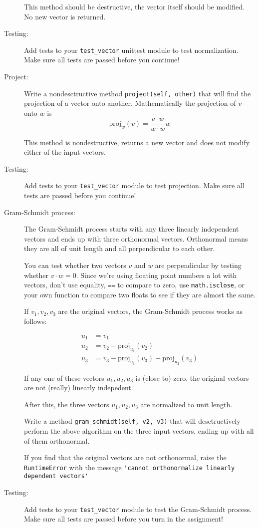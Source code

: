 \documentclass[12pt]{article}
\begin{document}
\begin{description}
This method should be destructive, the vector
itself should be modified.  No new vector is returned.


\item[Testing:] 
Add tests to your \lstinline{test_vector} unittest
module to test normalization.  Make sure all
tests are passed before
you continue!

\item[Project:] Write a nondesctructive method
\lstinline{project(self, other)}
that will find the projection of a vector onto another.
Mathematically the projection of $v$  onto $w$
is
\[ \mbox{proj}_w(v) = \frac{v \cdot w}{w \cdot w} w \]

This method is nondestructive, returns a new
vector and does not modify either of the input
vectors.


\item[Testing:] 
Add tests to your \lstinline{test_vector}
module to test projection.   Make sure all
tests are passed before
you continue!

\item[Gram-Schmidt process:]  The Gram-Schmidt
process starts with any three linearly independent
vectors and ends up with three orthonormal vectors.
Orthonormal means they are all of unit length
and all perpendicular to each other.

You can test whether two vectors $v$ and $w$ are perpendicular
by testing whether $v\cdot w = 0$.  Since we're using
floating point numbers a lot with vectors, don't use equality,
\lstinline{==} to compare to zero, use \lstinline{math.isclose},
or your own function to compare two floats to see
if they are almost the same.

If $v_1, v_2, v_3$ are the original vectors, the Gram-Schmidt
process works as follows:

\begin{align*}
u_1 &= v_1\\
u_2 &= v_2 - \mbox{proj}_{u_1}(v_2)\\
u_3 &= v_3 - \mbox{proj}_{u_1}(v_3)- \mbox{proj}_{u_2}(v_3)
\end{align*}

If any one of these vectors $u_1, u_2, u_3$ is (close to) zero,
the original vectors are not (really) linearly indepedent.

After this, the three vectors $u_1, u_2, u_3$ are
normalized to unit length.

Write a method \lstinline{gram_schmidt(self, v2, v3)}
that will desctructively perform the above algorithm
on the three input vectors, ending up with all of them
orthonormal. 

If you find that the original vectors are not
orthonormal, raise the \lstinline{RuntimeError}
with the message 
\lstinline{'cannot orthonormalize linearly dependent vectors'}



\item[Testing:] 
Add tests to your \lstinline{test_vector}
module to test the Gram-Schmidt process.   Make sure all
tests are passed before
you turn in the assignment!


\end{description}
\end{document}

